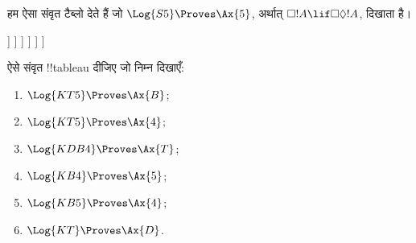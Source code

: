 \documentclass[../../../include/open-logic-section]{subfiles}
\begin{document}
\begin{ex}
  हम ऐसा संवृत टैब्लो देते हैं जो $\Log{S5} \Proves \Ax{5}$, अर्थात्
  $\Box!A \lif \Box\Diamond!A$, दिखाता है।
  \begin{oltableau}
    [\pFmla{\False}{\Box\formula{A} \lif \Box\Diamond \formula{A}}{1},
      just = \TAss
      [\pFmla{\True}{\Box \formula{A}}{1}, just = {\TRule{\False}{\lif}[1]}
        [\pFmla{\False}{\Box\Diamond \formula{A}}{1},
          just = {\TRule{\False}{\lif}[1]}
          [\pFmla{\False}{\Diamond \formula{A}}{1.1},
            just = {\TRule{\False}{\Box}[3]}
            [\pFmla{\False}{\Diamond \formula{A}}{1},
              just = {4r$\Diamond$ 4}
              [\pFmla{\False}{\formula{A}}{1.1},
                just = {\TRule{\False}{\Diamond}[5]}
                [\pFmla{\True}{\formula{A}}{1.1},
                  just = {\TRule{\True}{\Box}[2]}, close]
              ]
            ]
          ]
        ]
      ]
    ]
  \end{oltableau}
\end{ex}

\begin{prob}
ऐसे संवृत !!{tableau} दीजिए जो निम्न दिखाएँ:
  \begin{enumerate}
  \item $\Log{KT5} \Proves \Ax{B}$;
  \item $\Log{KT5} \Proves \Ax{4}$;
  \item $\Log{KDB4} \Proves \Ax{T}$;
  \item $\Log{KB4} \Proves \Ax{5}$;
  \item $\Log{KB5} \Proves \Ax{4}$;
  \item $\Log{KT} \Proves \Ax{D}$.
  \end{enumerate}
\end{prob}
\end{document}
